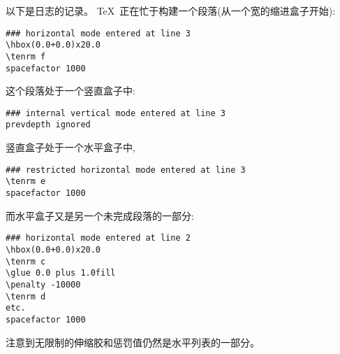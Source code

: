 \documentclass{book}
\begin{document}
以下是日志的记录。
\TeX\ 正在忙于构建一个段落(从一个\n{20pt}宽的缩进盒子开始):
\begin{verbatim}
### horizontal mode entered at line 3
\hbox(0.0+0.0)x20.0
\tenrm f
spacefactor 1000
\end{verbatim}
这个段落处于一个竖直盒子中:
\begin{verbatim}
### internal vertical mode entered at line 3
prevdepth ignored
\end{verbatim}
竖直盒子处于一个水平盒子中, 
\begin{verbatim}
### restricted horizontal mode entered at line 3
\tenrm e
spacefactor 1000
\end{verbatim}
而水平盒子又是另一个未完成段落的一部分:
\begin{verbatim}
### horizontal mode entered at line 2
\hbox(0.0+0.0)x20.0
\tenrm c
\glue 0.0 plus 1.0fill
\penalty -10000
\tenrm d
etc.
spacefactor 1000
\end{verbatim}
注意到无限制的伸缩胶和惩罚值仍然是水平列表的一部分。
\end{document}
